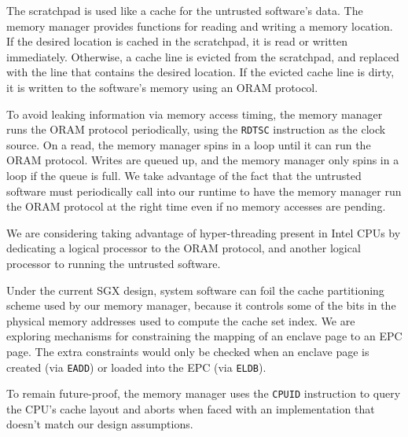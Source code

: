 The scratchpad is used like a cache for the untrusted software's data. The
memory manager provides functions for reading and writing a memory location.
If the desired location is cached in the scratchpad, it is read or written
immediately. Otherwise, a cache line is evicted from the scratchpad, and
replaced with the line that contains the desired location. If the evicted cache
line is dirty, it is written to the software's memory using an ORAM protocol.

To avoid leaking information via memory access timing, the memory manager
runs the ORAM protocol periodically, using the \texttt{RDTSC} instruction as
the clock source. On a read, the memory manager spins in a loop until it can
run the ORAM protocol. Writes are queued up, and the memory manager only spins
in a loop if the queue is full. We take advantage of the fact that the
untrusted software must periodically call into our runtime to have the memory
manager run the ORAM protocol at the right time even if no memory accesses are
pending.

We are considering taking advantage of hyper-threading present in Intel CPUs by
dedicating a logical processor to the ORAM protocol, and another logical
processor to running the untrusted software.

Under the current SGX design, system software can foil the cache partitioning
scheme used by our memory manager, because it controls some of the bits in the
physical memory addresses used to compute the cache set index. We are exploring
mechanisms for constraining the mapping of an enclave page to an EPC page. The
extra constraints would only be checked when an enclave page is created (via
\texttt{EADD}) or loaded into the EPC (via \texttt{ELDB}).

To remain future-proof, the memory manager uses the \texttt{CPUID} instruction
\cite{intel2013manual} to query the CPU's cache layout and aborts when faced
with an implementation that doesn't match our design assumptions.

